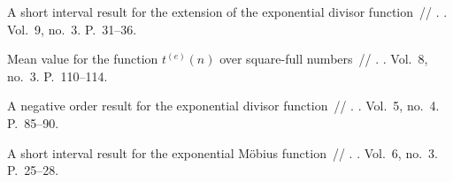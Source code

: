 \documentclass{article}
\begin{document}
\begin{thebibliography}{10}
 A short interval result for the extension of the exponential
  divisor function~// . \BibDash
{}. \BibDash
\newblock Vol.~9, no.~3. \BibDash
\newblock P.~31--36.

 Mean value for the function $t^{(e)}(n)$
  over square-full numbers~// . \BibDash
{}. \BibDash
\newblock Vol.~8, no.~3. \BibDash
\newblock P.~110--114.

 A negative order result for the exponential divisor
  function~// . \BibDash
{}. \BibDash
\newblock Vol.~5, no.~4. \BibDash
\newblock P.~85--90.

 A short interval result for the exponential Möbius
  function~// . \BibDash
{}. \BibDash
\newblock Vol.~6, no.~3. \BibDash
\newblock P.~25--28.

\end{thebibliography}
\end{document}
